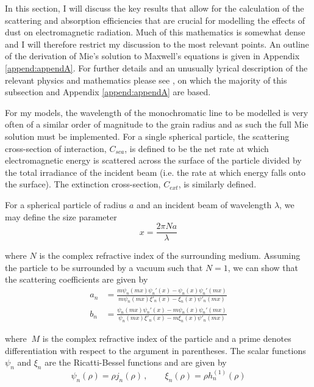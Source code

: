 In this section, I will discuss the key results that allow for the calculation of the scattering and absorption efficiencies that are crucial for modelling the effects of dust on electromagnetic radiation.  Much of this mathematics is somewhat dense and I will therefore restrict my discussion to the most relevant points. An outline of the derivation of  Mie's solution to Maxwell's equations is given in Appendix \ref{append:appendA}.  For further details and an unusually lyrical description of the relevant physics and mathematics please see \citet{Bohren1983}, on which the majority of this subsection and Appendix \ref{append:appendA} are based.  

For my models, the wavelength of the monochromatic line to be modelled is very often of a similar order of magnitude to the grain radius and as such the full Mie solution must be implemented.  %
For a single spherical particle, the scattering cross-section of interaction, $C_{sca}$, is defined to be the net rate at which electromagnetic energy is scattered across the surface of the particle divided by the total irradiance of the incident beam (i.e. the rate at which energy falls onto the surface).  The extinction cross-section, $C_{ext}$, is similarly defined.  

For a spherical particle of radius $a$ and an incident beam of wavelength $\lambda$, we may define the size parameter
\begin{equation}
x=\frac{2\pi N a}{\lambda}
\end{equation}

\noindent where $N$ is the complex refractive index of the surrounding medium.  Assuming the particle to be surrounded by a vacuum such that $N=1$, we can show that the scattering coefficients are given by 
\begin{align}
a_n &= \frac{m\psi_n(mx)\psi_n'(x)-\psi_n(x)\psi_n'(mx)}{m\psi_n(mx)\xi'_n(x)-\xi_n(x)\psi'_n(mx)} \\[2ex]
b_n &= \frac{\psi_n(mx)\psi_n'(x)-m\psi_n(x)\psi_n'(mx)}{\psi_n(mx)\xi'_n(x)-m\xi_n(x)\psi'_n(mx)}
\end{align}


\noindent where $~M$ is the complex refractive index of the particle and a prime denotes differentiation with respect to the argument in parentheses. The scalar functions $\psi_n$ and $\xi_n$ are the Ricatti-Bessel functions and are given by
\begin{equation}
\psi_n(\rho) = \rho j_n(\rho) \, , \quad \quad \xi_n(\rho)=\rho h_n^{(1)}(\rho)
\end{equation}

